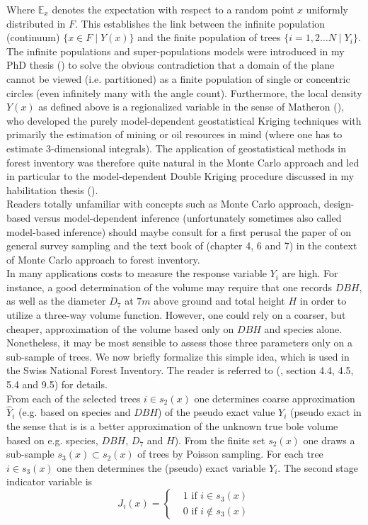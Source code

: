 \documentclass[a4paper,12pt,leqno, titlepage]{article}
\newcommand{\EX}{\mathbb{E}}
\begin{document}
 Where $\EX_x$ denotes the expectation with respect to a random point $x$ uniformly distributed in $F$. This establishes the link between the infinite population (continuum) $\{x\in{F} \mid Y(x)\}$ and the finite population of trees $\{i=1,2 \ldots N \mid Y_i\}$. The infinite populations and super-populations models were introduced in my PhD thesis (\cite{dmphd}) to solve the obvious contradiction that a domain of the plane cannot be viewed (i.e. partitioned) as a finite population of single or concentric circles (even infinitely many with the angle count). Furthermore, the local density $Y(x)$ as defined above is a regionalized variable in the sense of Matheron (\cite{matheron1}), who developed the purely model-dependent geostatistical Kriging techniques with primarily the estimation of mining or oil resources in mind (where one has to estimate 3-dimensional integrals). The application of geostatistical methods in forest inventory was therefore quite natural in the Monte Carlo approach and led in particular to the model-dependent Double Kriging procedure discussed in my habilitation thesis (\cite{dmhabil}).\\
 Readers totally unfamiliar with concepts such as Monte Carlo approach, design-based versus model-dependent inference (unfortunately sometimes also called model-based inference) should maybe consult for a first perusal the paper of \cite{gregoire3} on general survey sampling and the text book of \cite{mandallaz} (chapter 4, 6 and 7) in the context of Monte Carlo approach to forest inventory. \\[0.5cm]
 In many applications costs to measure the response variable $Y_i$ are high. For instance,
a good determination of the volume may require that one records
$DBH$, as well as the diameter $D_7$  at $7m$ above ground and total height $H$
in order to utilize a three-way volume function. However, one could rely
on a coarser, but cheaper, approximation of the volume based only on
$DBH$ and species alone. Nonetheless, it may be most sensible to assess those three
parameters only on a sub-sample of trees. We now briefly formalize this
simple idea, which is used in the Swiss National Forest Inventory. The reader is referred to (\cite{mandallaz}, section 4.4, 4.5, 5.4 and 9.5) for details. \\
From each of the selected trees $i\in{s_{2}(x)}$ one
determines coarse approximation $\hat{Y}_i$ (e.g. based on species and $DBH$) of the pseudo exact value $Y_i$ (pseudo exact in the sense that is is a better approximation of the unknown true bole volume based on e.g. species, $DBH$, $D_7$ and $H$). From the
finite set $s_{2}(x)$ one draws a sub-sample
$s_{3}(x)\subset{s_{2}(x)}$ of trees by Poisson sampling. For each tree $i\in{s_{3}(x)}$
one then determines the (pseudo) exact variable $Y_i$. The second stage indicator variable is
\begin{equation}
 J_i(x)=\begin{cases}&1 \text{ if $i\in s_{3}(x)$}\\
                      &0 \text{ if $i\not\in s_{3}(x)$}
         \end{cases}
\end{equation}
\end{document}
